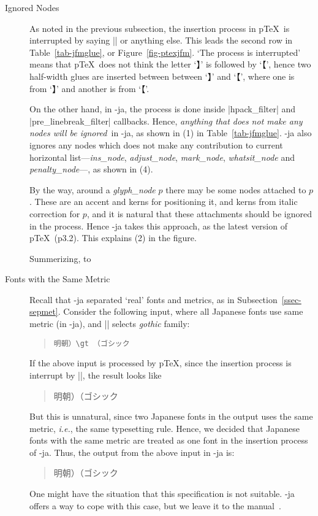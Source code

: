 \documentclass{ajt}
\begin{document}
\begin{description}
\item[Ignored Nodes]
As noted in the previous subsection, the insertion process in p\TeX\ is
	   interrupted by saying |{}| or anything else. This leads the
	   second row in Table~\ref{tab-jfmglue}, or
	   Figure~\ref{fig-ptexjfm}. `The process is interrupted'
	   means that p\TeX\ does not think the letter `】\inhibitglue'
	   is followed by `\inhibitglue【', hence two half-width glues
	   are inserted between between `】\inhibitglue' and
	   `\inhibitglue【', where one is from `】\inhibitglue' and
	   another is from `\inhibitglue【'.

	   On the other hand, in \LuaTeX-ja, the process is done inside
	   |hpack_filter| and |pre_linebreak_filter| callbacks. Hence,
	   \emph{anything that does not make any nodes will be
	   ignored}\ in \LuaTeX-ja, as shown in (1) in
	   Table~\ref{tab-jfmglue}. \LuaTeX-ja also ignores any nodes
	   which does not make any contribution to current horizontal
	   list---\emph{ins\_node}, \emph{adjust\_node},
	   \emph{mark\_node}, \emph{whatsit\_node} and
	   \emph{penalty\_node}---, as shown in (4).

By the way, around a \emph{glyph\_node} $p$ there may be some nodes
	   attached to $p$. These are an accent and kerns for
	   positioning it, and kerns from italic correction for $p$, and
	   it is natural that these attachments should be ignored in the
	   process. Hence \LuaTeX-ja takes this approach, as the latest
	   version of p\TeX\ (p3.2). This explains (2) in the figure.

Summerizing, to 

\item[Fonts with the Same Metric]
Recall that \LuaTeX-ja separated `real' fonts and metrics, as in Subsection~\ref{ssec-sepmet}. 
Consider the following input, where all Japanese fonts
	   use same metric (in \LuaTeX-ja), and |\gt| selects \emph{gothic} family:
\begin{quote}
\begin{verbatim}
明朝）\gt （ゴシック
\end{verbatim}
\end{quote}
If the above input is processed by p\TeX, since the insertion process is
	   interrupt by |\gt|, the result looks like
\begin{quote}
\mc 明朝）\hbox{}\gt （ゴシック
\end{quote}
But this is unnatural, since two Japanese fonts in the output uses the
same metric, \emph{i.e.}, the same typesetting rule.  Hence, we decided
that Japanese fonts with the same metric are treated as one font in the
insertion process of \LuaTeX-ja. Thus, the output from the above input
in \LuaTeX-ja is:
\begin{quote}
\mc 明朝）\gt （ゴシック
\end{quote}
One might have the situation that this specification is not
	   suitable. \LuaTeX-ja offers a way to cope with this case, but
	   we leave it to the manual~\cite{man}.


\end{description}
\end{document}
